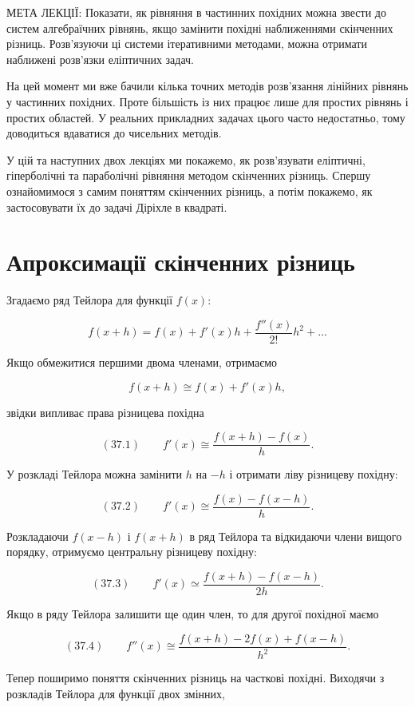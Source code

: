\documentclass[
  ukrainian,
]{article}
\begin{document}
МЕТА ЛЕКЦІЇ: Показати, як рівняння в частинних похідних можна звести до
систем алгебраїчних рівнянь, якщо замінити похідні наближеннями
скінченних різниць. Розв'язуючи ці системи ітеративними методами, можна
отримати наближені розв'язки еліптичних задач.

На цей момент ми вже бачили кілька точних методів розв'язання лінійних
рівнянь у частинних похідних. Проте більшість із них працює лише для
простих рівнянь і простих областей. У реальних прикладних задачах цього
часто недостатньо, тому доводиться вдаватися до чисельних методів.

У цій та наступних двох лекціях ми покажемо, як розв'язувати еліптичні,
гіперболічні та параболічні рівняння методом скінченних різниць. Спершу
ознайомимося з самим поняттям скінченних різниць, а потім покажемо, як
застосовувати їх до задачі Діріхле в квадраті.

\section{Апроксимації скінченних
різниць}\label{ux430ux43fux440ux43eux43aux441ux438ux43cux430ux446ux456ux457-ux441ux43aux456ux43dux447ux435ux43dux43dux438ux445-ux440ux456ux437ux43dux438ux446ux44c}

Згадаємо ряд Тейлора для функції \(f(x)\):

\[f(x+h)=f(x)+f'(x)h+\frac{f''(x)}{2!}h^2+\dots\]

Якщо обмежитися першими двома членами, отримаємо

\[f(x+h)\cong f(x)+f'(x)h,\]

звідки випливає права різницева похідна

\[(37.1)\qquad f'(x)\cong \frac{f(x+h)-f(x)}{h}.\]

У розкладі Тейлора можна замінити \(h\) на \(-h\) і отримати ліву
різницеву похідну:

\[(37.2)\qquad f'(x)\cong \frac{f(x)-f(x-h)}{h}.\]

Розкладаючи \(f(x-h)\) і \(f(x+h)\) в ряд Тейлора та відкидаючи члени
вищого порядку, отримуємо центральну різницеву похідну:

\[(37.3)\qquad f'(x)\simeq \frac{f(x+h)-f(x-h)}{2h}.\]

Якщо в ряду Тейлора залишити ще один член, то для другої похідної маємо

\[(37.4)\qquad f''(x)\cong \frac{f(x+h)-2f(x)+f(x-h)}{h^2}.\]

Тепер поширимо поняття скінченних різниць на часткові похідні. Виходячи
з розкладів Тейлора для функції двох змінних,
\end{document}
